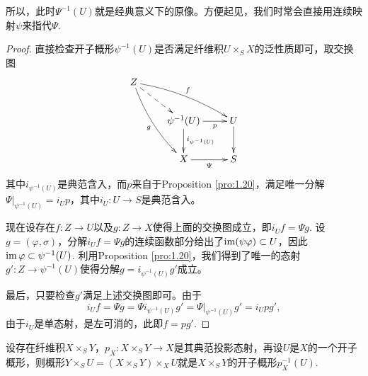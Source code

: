 所以，此时$\Psi^{-1}(U)$就是经典意义下的原像。方便起见，我们时常会直接用连续映射$\psi$来指代$\Psi$.

\begin{proof}
直接检查开子概形$\psi^{-1}(U)$是否满足纤维积$U\times_S X$的泛性质即可，取交换图
\[
\begin{xy}
	\xymatrix{
		Z\ar@/_/[rdd]_{g}\ar@/^/[drr]^{f}\ar@{-->}[dr]&&\\
		&\psi^{-1}(U)\ar[r]_-{p}\ar[d]^{i_{\psi^{-1}(U)}}&U\ar[d]\\
		&X\ar[r]_-\Psi & S
	}
\end{xy}
\]
其中$i_{\psi^{-1}(U)}$是典范含入，而$p$来自于Proposition \ref{pro:1.20}，满足唯一分解$\Psi|_{\psi^{-1}(U)}=i_Up$，其中$i_U:U\to S$是典范含入。

现在设存在$f:Z\to U$以及$g:Z\to X$使得上面的交换图成立，即$i_U f=\Psi g$. 设$g=(\varphi,\sigma)$，分解$i_U f=\Psi g$的连续函数部分给出了$\operatorname{im}(\psi\varphi)\subset U$，因此$\operatorname{im} \varphi\subset \psi^{-1}(U)$. 利用Proposition \ref{pro:1.20}，我们得到了唯一的态射$g':Z\to\psi^{-1}(U)$使得分解$g=i_{\psi^{-1}(U)}g'$成立。

最后，只要检查$g'$满足上述交换图即可。由于
\[
	i_U f = \Psi g = \Psi i_{\psi^{-1}(U)}g'=\Psi|_{\psi^{-1}(U)}g'=i_Upg',
\]
由于$i_U$是单态射，是左可消的，此即$f=pg'$.
\end{proof}

\begin{coro}
设存在纤维积$X\times_S Y$，$p_X:X\times_S Y\to X$是其典范投影态射，再设$U$是$X$的一个开子概形，则概形$Y\times_S U=(X\times_S Y)\times_X U$就是$X\times_S Y$的开子概形$p_X^{-1}(U)$.
\end{coro}



